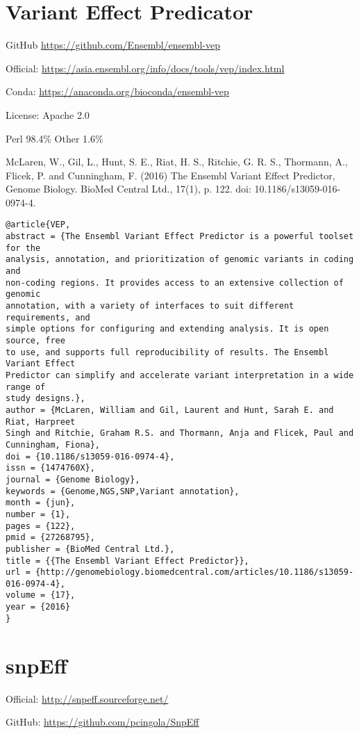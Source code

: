 \documentclass[]{article}
\begin{document}
\section{Variant Effect Predicator}

GitHub \url{https://github.com/Ensembl/ensembl-vep}

Official: \url{https://asia.ensembl.org/info/docs/tools/vep/index.html}

Conda: \url{https://anaconda.org/bioconda/ensembl-vep}

License: Apache 2.0

Perl 98.4\% Other 1.6\%



McLaren, W., Gil, L., Hunt, S. E., Riat, H. S., Ritchie, G. R. S., Thormann, A., Flicek, P. and Cunningham, F. (2016) The Ensembl Variant Effect Predictor, Genome Biology. BioMed Central Ltd., 17(1), p. 122. doi: 10.1186/s13059-016-0974-4.

\begin{verbatim}
@article{VEP,
abstract = {The Ensembl Variant Effect Predictor is a powerful toolset for the
analysis, annotation, and prioritization of genomic variants in coding and
non-coding regions. It provides access to an extensive collection of genomic
annotation, with a variety of interfaces to suit different requirements, and
simple options for configuring and extending analysis. It is open source, free
to use, and supports full reproducibility of results. The Ensembl Variant Effect
Predictor can simplify and accelerate variant interpretation in a wide range of
study designs.},
author = {McLaren, William and Gil, Laurent and Hunt, Sarah E. and Riat, Harpreet
Singh and Ritchie, Graham R.S. and Thormann, Anja and Flicek, Paul and
Cunningham, Fiona},
doi = {10.1186/s13059-016-0974-4},
issn = {1474760X},
journal = {Genome Biology},
keywords = {Genome,NGS,SNP,Variant annotation},
month = {jun},
number = {1},
pages = {122},
pmid = {27268795},
publisher = {BioMed Central Ltd.},
title = {{The Ensembl Variant Effect Predictor}},
url = {http://genomebiology.biomedcentral.com/articles/10.1186/s13059-016-0974-4},
volume = {17},
year = {2016}
}
\end{verbatim}

\section{snpEff}

Official: \url{http://snpeff.sourceforge.net/}

GitHub: \url{https://github.com/pcingola/SnpEff}
\end{document}
